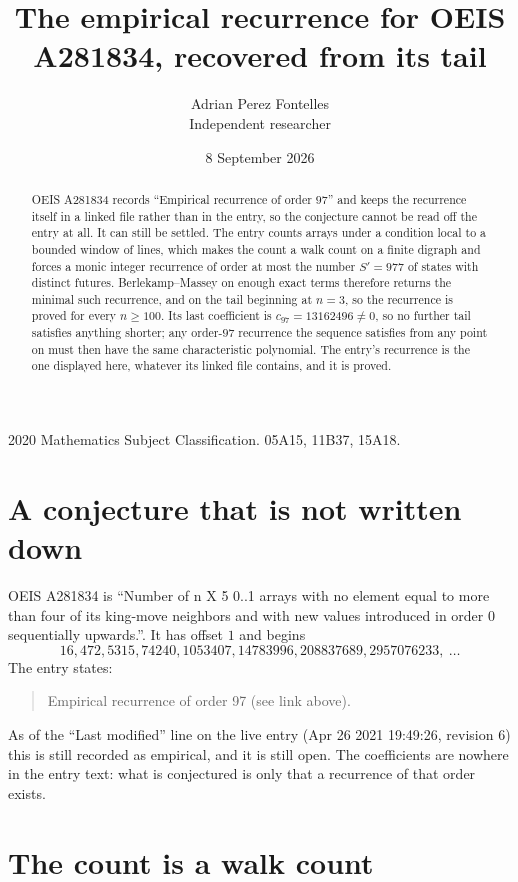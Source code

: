 \documentclass[11pt,a4paper]{article}
\title{The empirical recurrence for OEIS A281834, recovered from its tail}
\author{Adrian Perez Fontelles\\ \small Independent researcher}
\date{8 September 2026}
\theoremstyle{plain}
\theoremstyle{definition}
\begin{document}
\maketitle

\begin{abstract}
OEIS A281834 records ``Empirical recurrence of order $97$'' and keeps the recurrence itself in
a linked file rather than in the entry, so the conjecture cannot be read off the entry at all.
It can still be settled. The entry counts arrays under a condition local to a bounded window of
lines, which makes the count a walk count on a finite digraph and forces a monic integer
recurrence of order at most the number $S'=977$ of states with distinct futures. Berlekamp--Massey on
enough exact terms therefore returns the minimal such recurrence, and on the tail beginning at $n=3$, so the recurrence is proved for every $n\ge100$.
Its last coefficient is $c_{97}=13162496\neq0$, so no further tail satisfies anything
shorter; any order-$97$ recurrence the sequence satisfies from any point on must then have
the same characteristic polynomial. The entry's recurrence is the one displayed here, whatever
its linked file contains, and it is proved.
\end{abstract}

\noindent\small 2020 Mathematics Subject Classification. 05A15, 11B37, 15A18.\normalsize

\section{A conjecture that is not written down}

OEIS A281834 is ``Number of n X 5 0..1 arrays with no element equal to more than four of its king-move neighbors and with new values introduced in order 0 sequentially upwards.''. It has offset $1$ and begins
\[
16, 472, 5315, 74240, 1053407, 14783996, 208837689, 2957076233,\ \dots
\]
The entry states:
\begin{quote}
Empirical recurrence of order 97 (see link above).
\end{quote}
As of the ``Last modified'' line on the live entry (Apr 26 2021 19:49:26, revision 6)
this is still recorded as empirical, and it is still open. The coefficients are nowhere in the
entry text: what is conjectured is only that a recurrence of that order exists.

\section{The count is a walk count}
\end{document}
